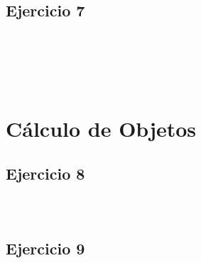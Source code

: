 \documentclass[10pt,a4paper]{article}
\begin{document}
\subsection{Ejercicio 7}
\subsubsection{}
    \begin{lstlisting}
    \end{lstlisting}
\subsubsection{}
    \begin{lstlisting}
    \end{lstlisting}
\subsubsection{}
    \begin{lstlisting}
    \end{lstlisting}
\subsubsection{}
    \begin{lstlisting}
    \end{lstlisting}

\section*{\centering Cálculo de Objetos}

\subsection{Ejercicio 8}
\subsubsection{}
    \begin{lstlisting}
    \end{lstlisting}
\subsubsection{}
    \begin{lstlisting}
    \end{lstlisting}
\subsection{Ejercicio 9}
\end{document}
